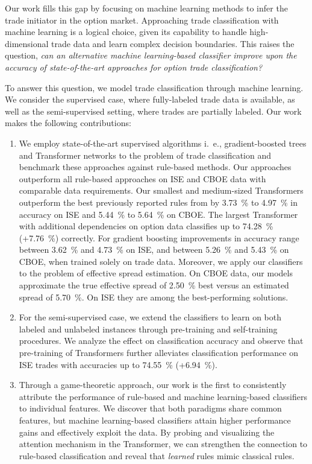 Our work fills this gap by focusing on machine learning methods to infer the trade initiator in the option market. Approaching trade classification with machine learning is a logical choice, given its capability to handle high-dimensional trade data and learn complex decision boundaries. This raises the question, \emph{can an alternative machine learning-based classifier improve upon the accuracy of state-of-the-art approaches for option trade classification?}

To answer this question, we model trade classification through machine learning. We consider the supervised case, where fully-labeled trade data is available, as well as the semi-supervised setting, where trades are partially labeled. Our work makes the following contributions:
\begin{enumerate}[label=(\roman*),noitemsep]
    \item We employ state-of-the-art supervised algorithms i.~e., gradient-boosted trees and Transformer networks to the problem of trade classification and benchmark these approaches against rule-based methods. Our approaches outperform all rule-based approaches on \gls{ISE} and \gls{CBOE} data with comparable data requirements. Our smallest and medium-sized Transformers outperform the best previously reported rules from \textcite[][13--15]{grauerOptionTradeClassification2022} by \SI{3.73}{\percent} to \SI{4.97}{\percent} in accuracy on \gls{ISE} and \SI{5.44}{\percent} to \SI{5.64}{\percent} on \gls{CBOE}. The largest Transformer with additional dependencies on option data classifies up to \SI{74.28}{\percent} (+\SI{7.76}{\percent}) correctly. For gradient boosting improvements in accuracy range between \SI{3.62}{\percent} and \SI{4.73}{\percent} on \gls{ISE}, and between \SI{5.26}{\percent} and \SI{5.43}{\percent} on \gls{CBOE}, when trained solely on trade data. Moreover, we apply our classifiers to the problem of effective spread estimation. On \gls{CBOE} data, our models approximate the true effective spread of \SI{2.50}{\percent} best versus an estimated spread of \SI{5.70}{\percent}. On \gls{ISE} they are among the best-performing solutions.
    \item For the semi-supervised case, we extend the classifiers to learn on both labeled and unlabeled instances through pre-training and self-training procedures. We analyze the effect on classification accuracy and observe that pre-training of Transformers further alleviates classification performance on \gls{ISE} trades with accuracies up to \SI{74.55}{\percent} (+\SI{6.94}{\percent}).
    \item Through a game-theoretic approach, our work is the first to consistently attribute the performance of rule-based and machine learning-based classifiers to individual features. We discover that both paradigms share common features, but machine learning-based classifiers attain higher performance gains and effectively exploit the data. By probing and visualizing the attention mechanism in the Transformer, we can strengthen the connection to rule-based classification and reveal that \emph{learned} rules mimic classical rules.
\end{enumerate}

